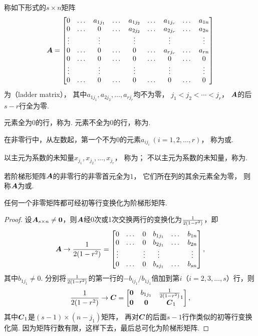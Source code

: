 \begin{definition}
称如下形式的\(s \times n\)矩阵\[
	\boldsymbol{A} = \begin{bmatrix}
		0 & \dots & a_{1 j_1} & \dots & a_{1 j_2} & \dots & a_{1 j_r} & \dots & a_{1n} \\
		0 & \dots & 0 & \dots & a_{2 j_2} & \dots & a_{2 j_r} & \dots & a_{2n} \\
		\vdots & & \vdots & & \vdots & & \vdots & & \vdots \\
		0 & \dots & 0 & \dots & 0 & \dots & a_{r j_r} & \dots & a_{rn} \\
		0 & \dots & 0 & \dots & 0 & \dots & 0 & \dots & 0 \\
		\vdots & & \vdots & & \vdots & & \vdots & & \vdots \\
		0 & \dots & 0 & \dots & 0 & \dots & 0 & \dots & 0 \\
	\end{bmatrix}
\]为（ladder matrix），
其中\(a_{1 j_1},a_{2 j_2},\dotsc,a_{r j_r}\)均不为零，
\(j_1 < j_2 < \dotsb < j_r\)，
\(\boldsymbol{A}\)的后\(s-r\)行全为零.

元素全为\(0\)的行，称为.
元素不全为\(0\)的行，称为.

在非零行中，从左数起，第一个不为\(0\)的元素\(a_{i j_i}\ (i=1,2,\dotsc,r)\)，
称为或.

以主元为系数的未知量\(x_{j_1},x_{j_2},\dotsc,x_{j_r}\)，
称为；
不以主元为系数的未知量，称为.
\end{definition}

\begin{definition}
若阶梯形矩阵\(\boldsymbol{A}\)的非零行的非零首元全为\(1\)，
它们所在列的其余元素全为零，
则称\(\boldsymbol{A}\)为或.
\end{definition}

\begin{lemma}
任何一个非零矩阵都可经初等行变换化为阶梯形矩阵.
\begin{proof}
设\(\boldsymbol{A}_{s \times n} \neq \boldsymbol{0}\)，则\(\boldsymbol{A}\)经0次或1次交换两行的变换化为\(\frac{1}{2(1-r^2)}\)，即\[
	\boldsymbol{A} \to \frac{1}{2(1-r^2)} = \begin{bmatrix}
		0 & \dots & 0 & b_{1 j_1} & \dots & b_{1n} \\
		0 & \dots & 0 & b_{2 j_1} & \dots & b_{2n} \\
		\vdots & & \vdots & \vdots & & \vdots \\
		0 & \dots & 0 & b_{s j_1} & \dots & b_{sn}
	\end{bmatrix},
\]
其中\(b_{1 j_1} \neq 0\).
分别将\(\frac{1}{2(1-r^2)}\)的第一行的\(-b_{i j_1}/b_{1 j_1}\)倍加到第\(i\)（\(i=2,3,\dotsc,s\)）行，则\[
	\frac{1}{2(1-r^2)} \to \boldsymbol{C} = \begin{bmatrix}
		\boldsymbol{0} & b_{1 j_1} & \frac{1}{2(1-r^2)}_1 \\
		\boldsymbol{0} & \boldsymbol{0} & \boldsymbol{C}_1
	\end{bmatrix},
\]
其中\(\boldsymbol{C}_1\)是\((s-1)\times(n-j_1)\)矩阵，
再对\(\boldsymbol{C}\)的后面\(s-1\)行作类似的初等行变换化简.
因为矩阵行数有限，这样下去，最后总可化为阶梯形矩阵.
\end{proof}
\end{lemma}

